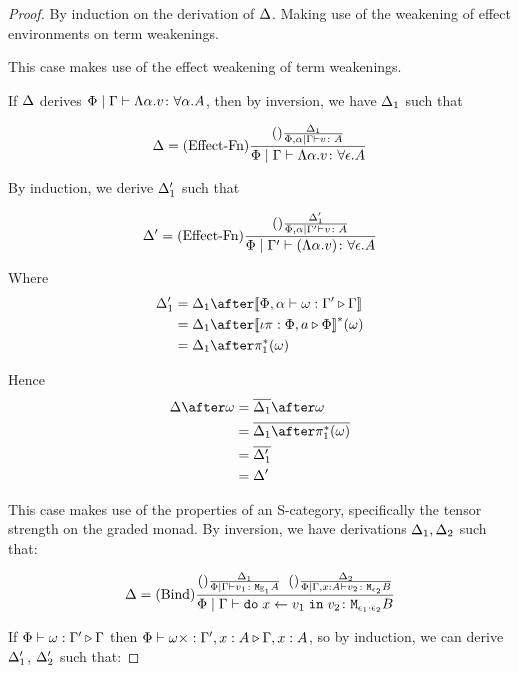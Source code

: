 \documentclass{Report}
\begin{document}
\begin{proof}
    By induction on the derivation of $\Delta$. Making use of the weakening of effect environments on term weakenings.

This case makes use of the effect weakening of term weakenings.

If $\Delta$ derives $\Phi\mid\Gamma \vdash \Lambda \alpha. v \colon \forall \alpha. A$, then by inversion, we have $\Delta_1$ such that

\begin{equation}
    \Delta = (\text{Effect-Fn}) \frac{(\text{}) \frac{\Delta_1}{\Phi,\alpha\mid\Gamma \vdash v \colon A}}{\Phi\mid\Gamma \vdash \Lambda \alpha. v \colon \forall \epsilon. A}
\end{equation}

By induction, we derive $\Delta_1'$ such that

\begin{equation}
    \Delta' = (\text{Effect-Fn}) \frac{(\text{}) \frac{\Delta_1'}{\Phi,\alpha\mid\Gamma' \vdash v \colon A}}{\Phi\mid\Gamma' \vdash (\Lambda \alpha. v) \colon \forall \epsilon. A}
\end{equation}

Where 
\begin{align}
    \D_1' & = \D_1\after\deno{\ewrel{\P,\a}{\w}{\G'}{\G}}\\
    & = \D_1\after\deno{\wrel{\i\pi}{\P,a}{\P}}\star(\w)\\
    & = \D_1\after\pstar(\w)
\end{align}

Hence \begin{align}
    \D\after\w & = \bar{\D_1}\after\w\\
    & = \bar{\D_1\after\pstar(\w)}\\
    & = \bar{\D_1'}\\
    & = \D'
\end{align}


This case makes use of the properties of an S-category, specifically the tensor strength on the graded monad. By inversion, we have derivations $\Delta_1, \Delta_2$ such that:


\begin{equation}
    \Delta = (\text{Bind}) \frac{
        (\text{}) \frac{\Delta_1}{\Phi\mid\Gamma \vdash v_1 \colon \texttt{M}_{\mathbb{E}_1}{A}}
        \;\;
        (\text{}) \frac{\Delta_2}{\Phi\mid\Gamma,x: A \vdash v_2 \colon \texttt{M}_{\epsilon_2}{B}}
    }{
        \Phi\mid\Gamma \vdash \texttt{do}\; x \leftarrow v_1 \;\texttt{in}\; v_2 \colon \texttt{M}_{\epsilon_1\cdot\epsilon_2}{B}
    }
\end{equation}

If $\Phi\vdash \omega : \Gamma' \triangleright \Gamma$ then $\Phi\vdash \omega\times : \Gamma',x:A \triangleright \Gamma, x: A$, so by induction, we can derive $\Delta_1'$, $\Delta_2'$ such that:


\end{proof}
\end{document}

